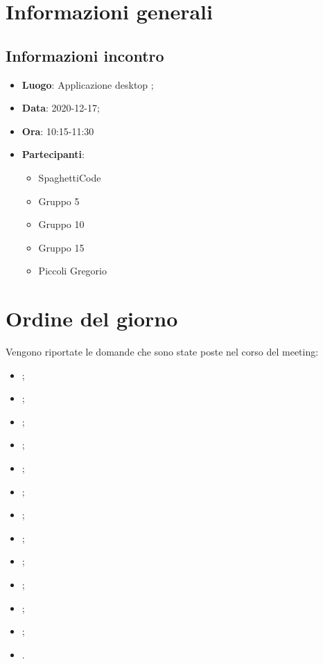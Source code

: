 \documentclass{article}
\begin{document}
	
	

\section{Informazioni generali}
\label{sec:info_generali}

\subsection{Informazioni incontro}
\label{sub:info_incontro}

\begin{itemize}
	\item \textbf{Luogo}: Applicazione desktop ;
	\item \textbf{Data}: 2020-12-17;
	\item \textbf{Ora}: 10:15-11:30
	\item \textbf{Partecipanti}:
	\begin{itemize}
		\item SpaghettiCode
		\item Gruppo 5
		\item Gruppo 10
		\item Gruppo 15
		\item Piccoli Gregorio
	\end{itemize}
\end{itemize}
	

\section{Ordine del giorno}
\label{sec:ordine_del_giorno}
	Vengono riportate le domande che sono state poste nel corso del meeting:
	\begin{itemize}
		\item {};
		\item {};
		\item {};
		\item {};
		\item {};
		\item {};
		\item {};
		\item {};
		\item {};
		\item {};
		\item {};
		\item {};
        \item {}.
    	\end{itemize}
\end{document}
